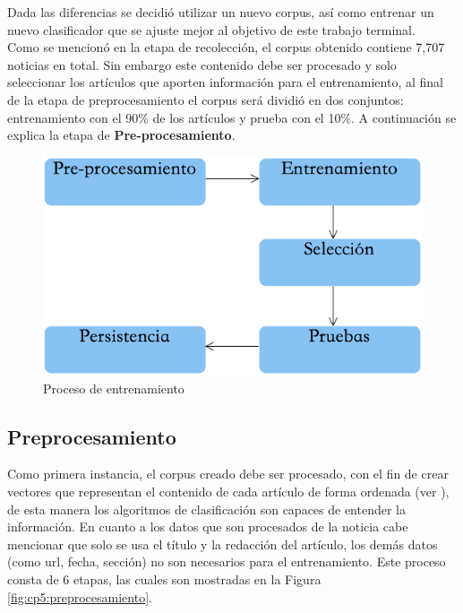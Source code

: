 Dada las diferencias se decidió utilizar un nuevo corpus, así como entrenar un nuevo clasificador que se ajuste mejor al objetivo de este trabajo terminal.\\


Como se mencionó en la etapa de recolección, el corpus obtenido contiene 7,707 noticias en total. Sin embargo este contenido debe ser procesado y solo seleccionar los artículos que aporten información para el entrenamiento, al final de la etapa de pre\-procesamiento el corpus será dividió en dos conjuntos: entrenamiento con el 90\% de los artículos y prueba con el 10\%. A continuación se explica la etapa de \textbf{Pre-procesamiento}.\\

\begin{figure}[h]
\centering
\includegraphics[scale=.55]{imagenes/capitulo5/Entrenamiento/Esquema.png}
\caption{Proceso de entrenamiento}
\label{fig:cp5:procesoE}
\end{figure}



\subsection{Preprocesamiento}

Como primera instancia, el corpus creado debe ser procesado, con el fin de crear vectores que representan el contenido de cada artículo de forma ordenada (ver ), de esta manera los algoritmos de clasificación son capaces de entender la información. En cuanto a los datos que son procesados de la noticia cabe mencionar que solo se usa el título y la redacción del artículo, los demás datos (como url, fecha, sección) no son necesarios para el entrenamiento. Este proceso consta de 6 etapas, las cuales son mostradas en la Figura \ref{fig:cp5:preprocesamiento}. \\

